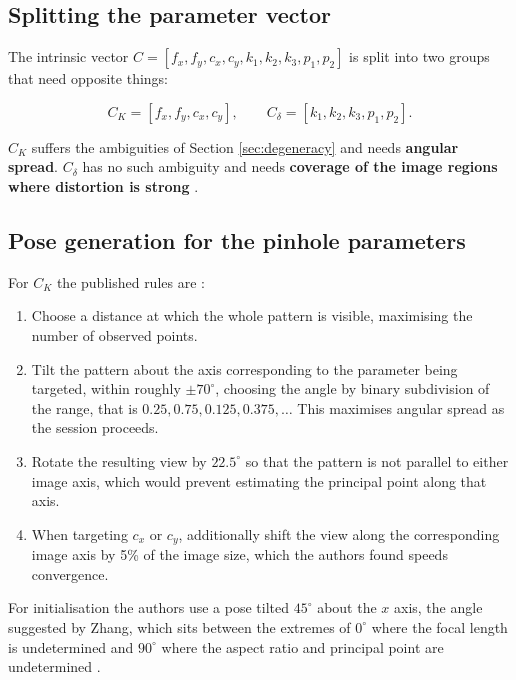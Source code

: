 \subsection{Splitting the parameter vector}

The intrinsic vector $C = [f_x, f_y, c_x, c_y, k_1, k_2, k_3, p_1, p_2]$ is split into two groups that need opposite things:

\begin{equation}
C_K = [f_x, f_y, c_x, c_y], \qquad C_\delta = [k_1, k_2, k_3, p_1, p_2] .
\label{eq:split}
\end{equation}

$C_K$ suffers the ambiguities of Section \ref{sec:degeneracy} and needs \textbf{angular spread}. $C_\delta$ has no such ambiguity and needs \textbf{coverage of the image regions where distortion is strong} \cite{rojtberg2018pose}.

\subsection{Pose generation for the pinhole parameters}

For $C_K$ the published rules are \cite{rojtberg2018pose}:

\begin{enumerate}
    \item Choose a distance at which the whole pattern is visible, maximising the number of observed points.
    \item Tilt the pattern about the axis corresponding to the parameter being targeted, within roughly $\pm 70^\circ$, choosing the angle by binary subdivision of the range, that is $0.25, 0.75, 0.125, 0.375, \ldots$ This maximises angular spread as the session proceeds.
    \item Rotate the resulting view by $22.5^\circ$ so that the pattern is not parallel to either image axis, which would prevent estimating the principal point along that axis.
    \item When targeting $c_x$ or $c_y$, additionally shift the view along the corresponding image axis by 5\% of the image size, which the authors found speeds convergence.
\end{enumerate}

For initialisation the authors use a pose tilted $45^\circ$ about the $x$ axis, the angle suggested by Zhang, which sits between the extremes of $0^\circ$ where the focal length is undetermined and $90^\circ$ where the aspect ratio and principal point are undetermined \cite{rojtberg2018pose,zhang2000flexible}.

